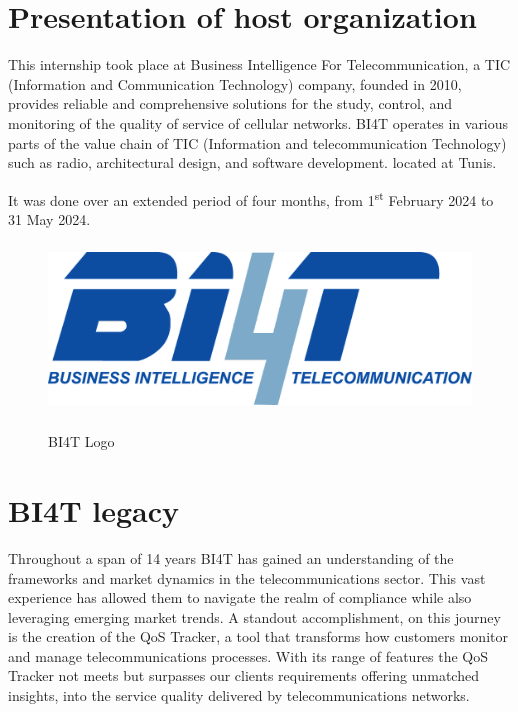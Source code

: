 \section{Presentation of host organization}

This internship took place at Business Intelligence For Telecommunication, a TIC (Information and Communication Technology) company, founded in 2010, provides reliable and comprehensive solutions for the study, control, and monitoring of the quality of service of cellular networks. BI4T operates in various parts of the value chain of TIC (Information and telecommunication Technology) such as radio, architectural design, and software development. located at Tunis.

It was done over an extended  period of four months, from 1\textsuperscript{st}
February 2024 to 31 May 2024.

\begin{figure}[H]
    \centering
    \includegraphics[height=4.5cm]{images/chap1/LOGO_BI4T.png}
    \caption{BI4T Logo} \cite{BI4T}
    \label{fig:enter-label}
\end{figure}

\section{BI4T legacy}
Throughout a span of 14 years BI4T has gained an understanding of the frameworks and market dynamics in the telecommunications sector. This vast experience has allowed them to navigate the realm of compliance while also leveraging emerging market trends. A standout accomplishment, on this journey is the creation of the QoS Tracker, a tool that transforms how customers monitor and manage telecommunications processes. With its range of features the QoS Tracker not meets but surpasses our clients requirements offering unmatched insights, into the service quality delivered by telecommunications networks.

